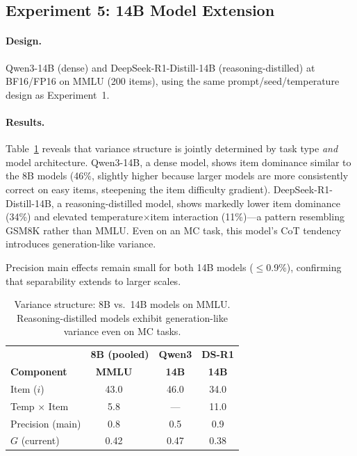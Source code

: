 \documentclass[11pt]{article}
\newcommand{\gcoeff}{G}
\begin{document}
\subsection{Experiment 5: 14B Model Extension}
\label{sec:exp5}

\paragraph{Design.}
Qwen3-14B (dense) and DeepSeek-R1-Distill-14B (reasoning-distilled) at BF16/FP16 on MMLU (200 items), using the same prompt/seed/temperature design as Experiment~1.

\paragraph{Results.}
Table~\ref{tab:scale} reveals that variance structure is jointly determined by task type \emph{and} model architecture.
Qwen3-14B, a dense model, shows item dominance similar to the 8B models (46\%, slightly higher because larger models are more consistently correct on easy items, steepening the item difficulty gradient).
DeepSeek-R1-Distill-14B, a reasoning-distilled model, shows markedly lower item dominance (34\%) and elevated temperature$\times$item interaction (11\%)---a pattern resembling GSM8K rather than MMLU.
Even on an MC task, this model's CoT tendency introduces generation-like variance.

Precision main effects remain small for both 14B models ($\leq$0.9\%), confirming that separability extends to larger scales.

\begin{table}[t]
\centering
\caption{Variance structure: 8B vs.\ 14B models on MMLU. Reasoning-distilled models exhibit generation-like variance even on MC tasks.}
\label{tab:scale}
\begin{tabular}{lcccc}
\toprule
& \multicolumn{2}{c}{\textbf{8B (pooled)}} & \textbf{Qwen3} & \textbf{DS-R1} \\
\textbf{Component} & \textbf{MMLU} & & \textbf{14B} & \textbf{14B} \\
\midrule
Item ($i$) & 43.0 & & 46.0 & 34.0 \\
Temp $\times$ Item & 5.8 & & --- & 11.0 \\
Precision (main) & 0.8 & & 0.5 & 0.9 \\
$\gcoeff$ (current) & 0.42 & & 0.47 & 0.38 \\
\bottomrule
\end{tabular}
\end{table}
\end{document}
